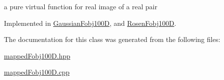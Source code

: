 a pure virtual function for real image of a real pair 



\-Implemented in \hyperlink{classGaussianFobj100D_aab5b1387768ff96d70c88b4a85532753}{\-Gaussian\-Fobj100\-D}, and \hyperlink{classRosenFobj100D_a0fcd3fc10a477991fd44ef3f27d4005a}{\-Rosen\-Fobj100\-D}.



\-The documentation for this class was generated from the following files\-:\begin{DoxyCompactItemize}
\item 
\hyperlink{mappedFobj100D_8hpp}{mapped\-Fobj100\-D.\-hpp}\item 
\hyperlink{mappedFobj100D_8cpp}{mapped\-Fobj100\-D.\-cpp}\end{DoxyCompactItemize}
